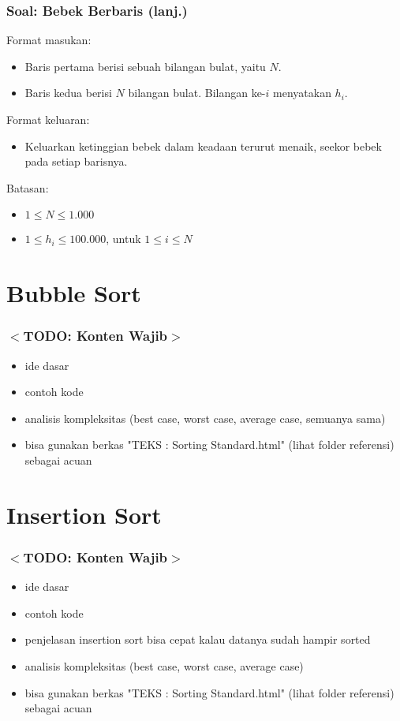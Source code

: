 \documentclass{beamer}
\begin{document}
\begin{frame}
\frametitle{Soal: Bebek Berbaris (lanj.)}
Format masukan:
\begin{itemize}
	\item Baris pertama berisi sebuah bilangan bulat, yaitu $N$.
	\item Baris kedua berisi $N$ bilangan bulat. Bilangan ke-$i$ menyatakan $h_i$.
\end{itemize}
Format keluaran:
\begin{itemize}
	\item Keluarkan ketinggian bebek dalam keadaan terurut menaik, seekor bebek pada setiap barisnya.
\end{itemize}
Batasan:
\begin{itemize}
	\item $1 \le N \le 1.000$
	\item $1 \le h_i \le 100.000$, untuk $1 \le i \le N$
\end{itemize}
\end{frame}

\section{Bubble Sort}
\frame{\sectionpage}

\begin{frame}
\frametitle{$<$TODO: Konten Wajib$>$}
\begin{itemize}
	\item ide dasar
	\item contoh kode
	\item analisis kompleksitas (best case, worst case, average case, semuanya sama)
	\item bisa gunakan berkas "TEKS : Sorting Standard.html" (lihat folder referensi) sebagai acuan
\end{itemize}
\end{frame}

\section{Insertion Sort}
\frame{\sectionpage}

\begin{frame}
\frametitle{$<$TODO: Konten Wajib$>$}
\begin{itemize}
	\item ide dasar
	\item contoh kode
	\item penjelasan insertion sort bisa cepat kalau datanya sudah hampir sorted
	\item analisis kompleksitas (best case, worst case, average case)
	\item bisa gunakan berkas "TEKS : Sorting Standard.html" (lihat folder referensi) sebagai acuan
\end{itemize}
\end{frame}
\end{document}
